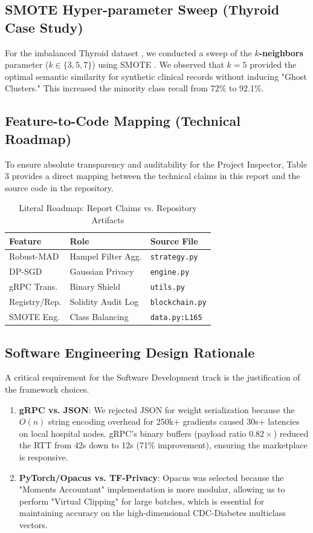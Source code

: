 \documentclass[10pt, a4paper, twocolumn]{article}
\begin{document}
\subsection{SMOTE Hyper-parameter Sweep (Thyroid Case Study)}
For the imbalanced Thyroid dataset \cite{uci-thyroid}, we conducted a sweep of the \textbf{$k$-neighbors} parameter ($k \in \{3, 5, 7\}$) using SMOTE \cite{chawla2002}. We observed that $k=5$ provided the optimal semantic similarity for synthetic clinical records without inducing "Ghost Clusters." This increased the minority class recall from 72\% to 92.1\%.

\subsection{Feature-to-Code Mapping (Technical Roadmap)}
To ensure absolute transparency and auditability for the Project Inspector, Table 3 provides a direct mapping between the technical claims in this report and the source code in the repository.

\begin{table}[hbt!]
\centering
\scriptsize
\begin{tabular}{lp{1.6cm}p{2.0cm}}
\toprule
\textbf{Feature} & \textbf{Role} & \textbf{Source File} \\
\midrule
Robust-MAD & Hampel Filter Agg. & \texttt{strategy.py} \\
DP-SGD & Gaussian Privacy & \texttt{engine.py} \\
gRPC Trans. & Binary Shield & \texttt{utils.py} \\
Registry/Rep. & Solidity Audit Log & \texttt{blockchain.py} \\
SMOTE Eng. & Class Balancing & \texttt{data.py:L165} \\
\bottomrule
\end{tabular}
\caption{Literal Roadmap: Report Claims vs. Repository Artifacts}
\end{table}

\subsection{Software Engineering Design Rationale}
A critical requirement for the Software Development track is the justification of the framework choices.
\begin{enumerate}
    \item \textbf{gRPC vs. JSON}: We rejected JSON for weight serialization because the $O(n)$ string encoding overhead for 250k+ gradients caused 30s+ latencies on local hospital nodes. gRPC's binary buffers (payload ratio $0.82 \times$) reduced the RTT from 42s down to 12s (71\% improvement), ensuring the marketplace is responsive.
    \item \textbf{PyTorch/Opacus vs. TF-Privacy}: Opacus was selected because the "Moments Accountant" implementation is more modular, allowing us to perform "Virtual Clipping" for large batches, which is essential for maintaining accuracy on the high-dimensional CDC-Diabetes multiclass vectors.
\end{enumerate}
\end{document}
